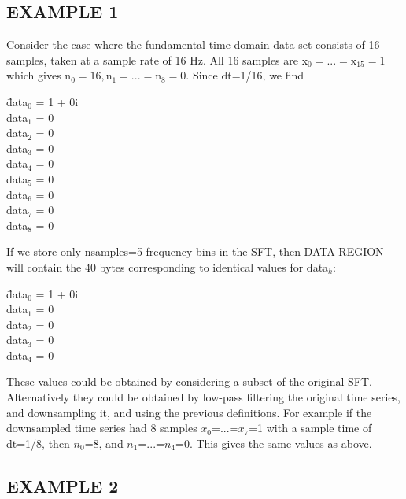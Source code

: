 \documentclass{ligodcc}
\begin{document}
\subsection{EXAMPLE 1}

Consider the case where the fundamental time-domain data set consists
of 16 samples, taken at a sample rate of 16 Hz.  All 16 samples are
x$_0=...=\mathrm{x}_{15}=1$ which gives n$_0=16, \mathrm{n}_1=...=\mathrm{n}_8=0$.  Since dt=1/16, we find\\
\begin{tabbing}
\hspace{2cm} \= data$_0$ = 1 + 0i\\
\> data$_1$ = 0\\
\> data$_2$ = 0\\
\> data$_3$ = 0\\
\> data$_4$ = 0\\
\> data$_5$ = 0\\
\> data$_6$ = 0\\
\> data$_7$ = 0\\
\> data$_8$ = 0\\
\end{tabbing}
If we store only nsamples=5 frequency bins in the SFT, then DATA
REGION will contain the 40 bytes corresponding to identical values for
data$_k$:
\begin{tabbing}
\hspace{2cm} \= data$_0$ = 1 + 0i\\
\> data$_1$ = 0\\
\> data$_2$ = 0\\
\> data$_3$ = 0\\
\> data$_4$ = 0\\
\end{tabbing}
These values could be obtained by considering a subset of the original
SFT.  Alternatively they could be obtained by low-pass filtering the
original time series, and downsampling it, and using the previous
definitions.  For example if the downsampled time series had 8 samples
$x_0$=...=$x_7$=1 with a sample time of dt=1/8, then $n_0$=8, and
$n_1$=...=$n_4$=0.  This gives the same values as above.

\subsection{EXAMPLE 2}
\end{document}
